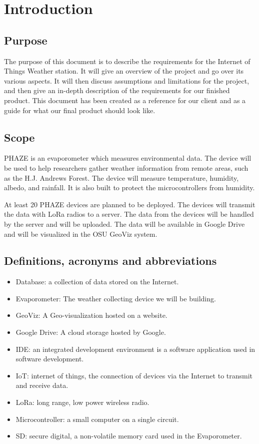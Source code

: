 \documentclass[onecolumn, draftclsnofoot,10pt, compsoc]{IEEEtran}
\begin{document}
\section{Introduction}
\subsection{Purpose}
The purpose of this document is to describe the requirements for the Internet of Things Weather station. It will give an overview of the project and go over its various aspects. It will then discuss assumptions and limitations for the project, and then give an in-depth description of the requirements for our finished product. This document has been created as a reference for our client and as a guide for what our final product should look like.
\subsection{Scope}
PHAZE is an evaporometer which measures environmental data. The device will be used to help researchers gather weather information from remote areas, such as the H.J. Andrews Forest. The device will measure temperature, humidity, albedo, and rainfall. It is also built to protect the microcontrollers from humidity. 


At least 20 PHAZE devices are planned to be deployed. The devices will transmit the data with LoRa radios to a server. The data from the devices will be handled by the server and will be uploaded. The data will be available in Google Drive and will be visualized in the OSU GeoViz system. 

\subsection{Definitions, acronyms and abbreviations}
\begin{itemize}
\item Database: a collection of data stored on the Internet.
\item Evaporometer: The weather collecting device we will be building.
\item GeoViz: A Geo-visualization hosted on a website.
\item Google Drive: A cloud storage hosted by Google.
\item IDE: an integrated development environment is a software application used in software development.
\item IoT: internet of things, the connection of devices via the Internet to transmit and receive data.
\item LoRa: long range, low power wireless radio.
\item Microcontroller: a small computer on a single circuit.

\item SD: secure digital, a non-volatile memory card used in the Evaporometer.


\end{itemize}
\end{document}
